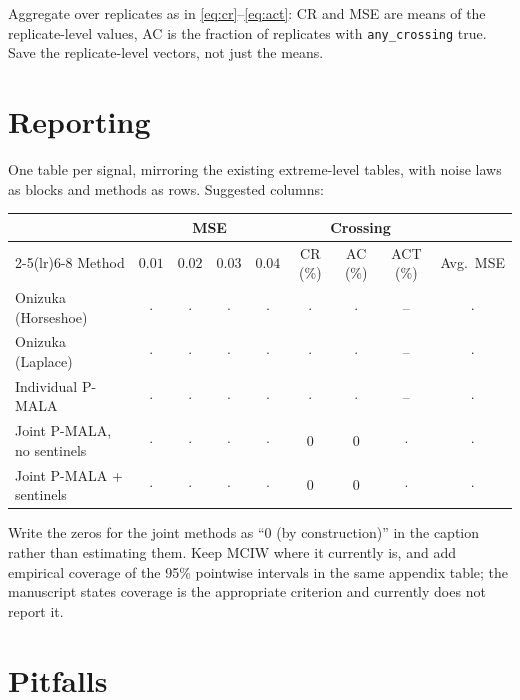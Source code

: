 \documentclass[11pt]{article}
\begin{document}
Aggregate over replicates as in \eqref{eq:cr}--\eqref{eq:act}: CR and MSE are means of the replicate-level values, AC is the fraction of replicates with \texttt{any\_crossing} true. Save the replicate-level vectors, not just the means.

\section{Reporting}

One table per signal, mirroring the existing extreme-level tables, with noise laws as blocks and methods as rows. Suggested columns:

\begin{center}
\small
\begin{tabular}{lcccccccc}
\toprule
& \multicolumn{4}{c}{MSE} & \multicolumn{3}{c}{Crossing} & \\
\cmidrule(lr){2-5}\cmidrule(lr){6-8}
Method & $0.01$ & $0.02$ & $0.03$ & $0.04$ & CR (\%) & AC (\%) & ACT (\%) & Avg.\ MSE \\
\midrule
Onizuka (Horseshoe) & $\cdot$ & $\cdot$ & $\cdot$ & $\cdot$ & $\cdot$ & $\cdot$ & -- & $\cdot$ \\
Onizuka (Laplace) & $\cdot$ & $\cdot$ & $\cdot$ & $\cdot$ & $\cdot$ & $\cdot$ & -- & $\cdot$ \\
Individual P-MALA & $\cdot$ & $\cdot$ & $\cdot$ & $\cdot$ & $\cdot$ & $\cdot$ & -- & $\cdot$ \\
Joint P-MALA, no sentinels & $\cdot$ & $\cdot$ & $\cdot$ & $\cdot$ & 0 & 0 & $\cdot$ & $\cdot$ \\
Joint P-MALA + sentinels & $\cdot$ & $\cdot$ & $\cdot$ & $\cdot$ & 0 & 0 & $\cdot$ & $\cdot$ \\
\bottomrule
\end{tabular}
\end{center}

Write the zeros for the joint methods as ``0 (by construction)'' in the caption rather than estimating them. Keep MCIW where it currently is, and add empirical coverage of the 95\% pointwise intervals in the same appendix table; the manuscript states coverage is the appropriate criterion and currently does not report it.

\section{Pitfalls}
\end{document}
